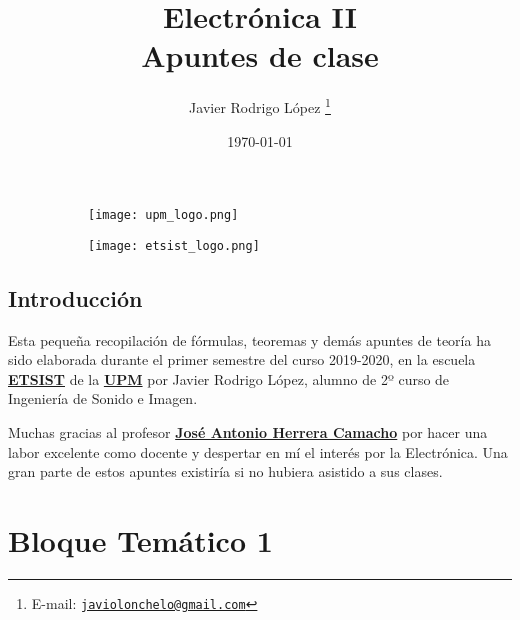 \documentclass[a4paper]{book}
\title{\Huge Electrónica II\\
\Large Apuntes de clase}
\author{Javier Rodrigo López \thanks{E-mail: \href{mailto:javiolonchelo@gmail.com}{\texttt{javiolonchelo@gmail.com}}}}
\date{\today}
\begin{document}
\setlength{\wpYoffset}{-5 cm}
\maketitle



\begin{figure}[t!]
	\centering
	\begin{subfigure}[b]{0.65\linewidth}
		\texttt{[image: upm\_logo.png]}
	\end{subfigure}
	\begin{subfigure}[b]{0.25\linewidth}
		\texttt{[image: etsist\_logo.png]}
	\end{subfigure}
\end{figure}


\newpage

\setlength{\parskip}{0.5em}

\section*{Introducción}
Esta pequeña recopilación de fórmulas, teoremas y demás apuntes de teoría ha sido elaborada durante el primer semestre del curso 2019-2020, en la escuela \href{https://www.etsist.upm.es/}{\textbf{ETSIST}} de la \href{http://www.upm.es/}{\textbf{UPM}} por Javier Rodrigo López, alumno de 2º curso de Ingeniería de Sonido e Imagen.

Muchas gracias al profesor \href{https://www.euitt.upm.es/escuela/directorio?departamento=DTE&idTrabajador=c0874849914b0380a54a53f80d4d60f1}{\textbf{José Antonio Herrera Camacho}} por hacer una labor excelente como docente y despertar en mí el interés por la Electrónica. Una gran parte de estos apuntes existiría si no hubiera asistido a sus clases.
\newpage

\setlength{\parskip}{0em}
\tableofcontents 
\setlength{\parskip}{0.5em}


\chapter{Bloque Temático 1}
\end{document}
